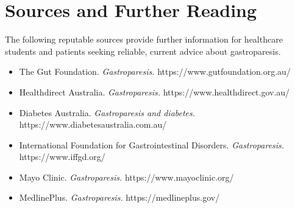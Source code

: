 \section*{Sources and Further Reading}
The following reputable sources provide further information for healthcare students and patients seeking reliable, current advice about gastroparesis.
\begin{itemize}
    \item The Gut Foundation. \textit{Gastroparesis.} https://www.gutfoundation.org.au/
    \item Healthdirect Australia. \textit{Gastroparesis.} https://www.healthdirect.gov.au/
    \item Diabetes Australia. \textit{Gastroparesis and diabetes.} https://www.diabetesaustralia.com.au/
    \item International Foundation for Gastrointestinal Disorders. \textit{Gastroparesis.} https://www.iffgd.org/
    \item Mayo Clinic. \textit{Gastroparesis.} https://www.mayoclinic.org/
    \item MedlinePlus. \textit{Gastroparesis.} https://medlineplus.gov/
\end{itemize}
